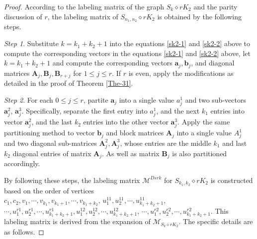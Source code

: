 \documentclass[12pt]{article}
\begin{document}
\begin{proof}
According to the labeling matrix of the graph $S_{k}\diamond rK_{2}$ and the parity discussion of $r$, the labeling matrix of $S_{n_{1},n_{2}}\diamond rK_{2}$ is obtained by the following steps.

{\it Step 1}. Substitute $k=k_{1}+k_{2}+1$ into the equations \eqref{sk2-1} and \eqref{sk2-2} above to compute the corresponding vectors
in the equations \eqref{sk2-1} and \eqref{sk2-2} above, let $k=k_{1}+k_{2}+1$ and compute the corresponding vectors $\boldsymbol{a}_{j},\boldsymbol{b}_{j}$, and diagonal matrices $\boldsymbol{A}_{j},\boldsymbol{B}_{j},\boldsymbol{B}_{r+j}$ for $1\leq j\leq r$. If $r$ is even, apply the modifications as detailed in the proof of  Theorem \ref{The-31}.

{\it Step 2}. For each $0\leq j\leq r$, partite $\boldsymbol{a}_{j}$ into a single value $a_{j}^{1}$ and two sub-vectors $\boldsymbol{a}_{j}^{2}$, $\boldsymbol{a}_{j}^{3}$. Specifically, separate the first entry into $a_{j}^{1}$, and the next $k_{1}$ entries into vector $\boldsymbol{a}_{j}^{2}$, and the last $k_{2}$ entries into the other vector $\boldsymbol{a}_{j}^{3}$.   Apply the same partitioning method to vector $\boldsymbol{b}_{j}$ and block matrices $\boldsymbol{A}_{j}$ into a single value $A_{j}^{1}$ and two diagonal sub-matrices $\boldsymbol{A}_{j}^{2},\boldsymbol{A}_{j}^{3}$, whose entries are the middle $k_{1}$ and last $k_{2}$ diagonal entries of matrix $\boldsymbol{A}_{j}$. As well as matrix $\boldsymbol{B}_{j}$ is also partitioned accordingly.

By following these steps, the labeling matrix $\boldsymbol{\mathcal{M}}^{Dsrk}$ for $S_{k_{1},k_{2}}\diamond rK_{2}$ is constructed based on the order of vertices $c_{1},c_{2},v_{1},\cdots,v_{k_{1}},v_{k_{1}+1},\cdots,v_{k_{1}+k_{2}},\,u_{1}^{11},u_{2}^{11},\cdots,u_{k_{1}+k_{2}+1}^{11}$, $\cdots,u_{1}^{r1},u_{2}^{r1},\cdots,u_{k_{1}+k_{2}+1}^{r1},u_{1}^{12},u_{2}^{12},\cdots,u_{k_{1}+k_{2}+1}^{12},\,\cdots,u_{1}^{r2},u_{2}^{r2},\cdots,u_{k_{1}+k_{2}+1}^{r2}$. This labeling matrix is derived from the expansion of $\boldsymbol{\mathcal{M}}_{S_{k}\diamond rK_{2}}$. The specific details are as follows.


\end{proof}
\end{document}

